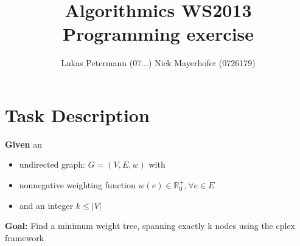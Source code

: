 \documentclass[a4paper,11pt]{article}
\title{Algorithmics WS2013 Programming exercise}
\author{Lukas Petermann (07...) \quad Nick Mayerhofer (0726179)}
\begin{document}
\maketitle
\tableofcontents

\newpage
\section{Task Description}
\textbf{Given} an 
\begin{itemize}
  \item undirected graph: $G=(V,E,w)$ with
  \item nonnegative weighting function $ w(e) \in \mathbb{R}_0^+ , \forall e \in E$
  \item and an integer $k \leq |V|$
\end{itemize}

\textbf{Goal:}
Find a minimum weight tree, spanning exactly k nodes using the cplex framework






\end{document}
